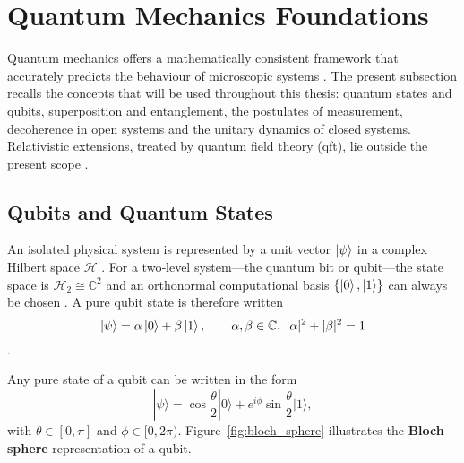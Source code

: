 
% 
% 
% 
%  
%     

\section{Quantum Mechanics Foundations}
\label{sec:qm-foundations}

Quantum mechanics offers a mathematically consistent framework that accurately predicts the behaviour of microscopic systems \cite{Dirac1930,NielsenChuang2010}.  
The present subsection recalls the concepts that will be used throughout this thesis: quantum states and qubits, superposition and entanglement, the postulates of measurement, decoherence in open systems and the unitary dynamics of closed systems.  Relativistic extensions, treated by quantum field theory (\gls{qft}), lie outside the present scope \cite{Weinberg1995}.

\subsection{Qubits and Quantum States}

An isolated physical system is represented by a unit vector $\ket{\psi}$ in a complex Hilbert space $\mathcal H$ \cite{Dirac1930}.  
For a two‐level system—the quantum bit or qubit—the state space is $\mathcal H_2\cong\mathbb C^2$ and an orthonormal computational basis $\{\ket{0},\ket{1}\}$ can always be chosen \cite{NielsenChuang2010}.  
A pure qubit state is therefore written  
\begin{equation}
  \ket{\psi}= \alpha\ket{0}+\beta\ket{1},\qquad 
  \alpha,\beta\in\mathbb C,\;|\alpha|^{2}+|\beta|^{2}=1
\end{equation}\cite{NielsenChuang2010}.

Any pure state of a \gls{qubit} can be written in the form
\[
|\psi\rangle = \cos\frac{\theta}{2}|0\rangle + e^{i\phi}\sin\frac{\theta}{2}|1\rangle,
\]
with \(\theta \in [0,\pi]\) and \(\phi \in [0,2\pi)\). Figure~\ref{fig:bloch_sphere} illustrates the \textbf{Bloch sphere} representation of a qubit.

